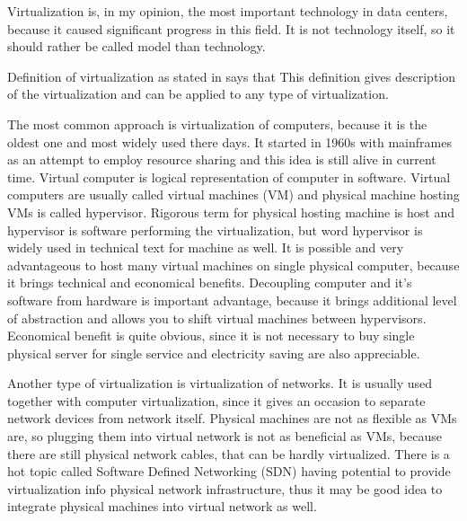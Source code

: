 
Virtualization is, in my opinion, the most important technology in data centers, because it caused significant progress in this field. It is not technology itself, so it should rather be called model than technology.

Definition of virtualization as stated in \cite{virtualization-in-education} says that  This definition gives description of the virtualization and can be applied to any type of virtualization.

The most common approach is virtualization of computers, because it is the oldest one and most widely used there days. It started in 1960s with mainframes as an attempt to employ resource sharing and this idea is still alive in current time. Virtual computer is logical representation of computer in software. \cite{virtualization-in-education} Virtual computers are usually called virtual machines (\Ac{VM}) and physical machine hosting \Ac{VM}s is called hypervisor. Rigorous term for physical hosting machine is host and hypervisor is software performing the virtualization, but word hypervisor is widely used in technical text for machine as well. It is possible and very advantageous to host many virtual machines on single physical computer, because it brings technical and economical benefits. Decoupling computer and it's software from hardware is important advantage, because it brings additional level of abstraction and allows you to shift virtual machines between hypervisors. Economical benefit is quite obvious, since it is not necessary to buy single physical server for single service and electricity saving are also appreciable.

Another type of virtualization is virtualization of networks. It is usually used together with computer virtualization, since it gives an occasion to separate network devices from network itself. Physical machines are not as flexible as \Ac{VM}s are, so plugging them into virtual network is not as beneficial as \Ac{VM}s, because there are still physical network cables, that can be hardly virtualized. There is a hot topic called Software Defined Networking (\Ac{SDN}) having potential to provide virtualization info physical network infrastructure, thus it may be good idea to integrate physical machines into virtual network as well.

